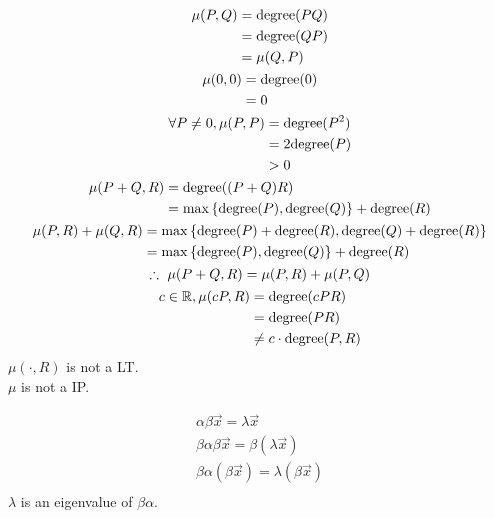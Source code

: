 \documentclass{mathtoolkit}
\begin{document}
\begin{p}
  \item
    \begin{gather*}
      \begin{aligned}
        \mu(P, Q) & = \deg{PQ} \\
                  & = \deg{QP} \\
                  & = \mu(Q, P)
      \end{aligned} \\
      \begin{aligned}
        \mu(0, 0) & = \deg{0} \\
                  & = 0
      \end{aligned} \\
      \begin{aligned}
        \forall P \ne 0, \mu(P, P) & = \deg{P^2} \\
                                   & = 2 \deg{P} \\
                                   & > 0
      \end{aligned} \\
      \begin{aligned}
        \mu(P + Q, R) & = \deg{(P + Q} R) \\
                      & = \max \left\{ \deg{P}, \deg{Q} \right\} + \deg{R}
      \end{aligned} \\
      \begin{aligned}
        \mu(P, R) + \mu(Q, R) & = \max \left\{ \deg{P} + \deg{R}, \deg{Q} + \deg{R} \right\} \\
                              & = \max \left\{ \deg{P}, \deg{Q} \right\} + \deg{R}
      \end{aligned} \\
      \therefore \mu(P + Q, R) = \mu(P, R) + \mu(P, Q) \\
      \begin{aligned}
        c \in \field{R}, \mu(cP, R) & = \deg{cPR} \\
                                    & = \deg{PR} \\
                                    & \ne c \cdot \deg{P, R}
      \end{aligned} \\
    \end{gather*}
    \therefore $\mu(\cdot, R)$ is not a LT. \\
    \therefore $\mu$ is not a IP.

  \item
    \begin{gather*}
      \alpha \beta \vec{x} = \lambda \vec{x} \\
      \beta \alpha \beta \vec{x} = \beta (\lambda \vec{x}) \\
      \beta \alpha (\beta \vec{x}) = \lambda (\beta \vec{x}) \\
    \end{gather*}
    \therefore $\lambda$ is an eigenvalue of $\beta \alpha$.


\end{p}
\end{document}
